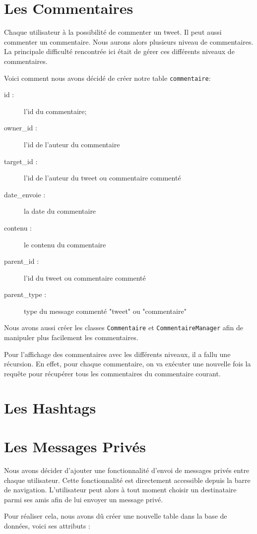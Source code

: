 \documentclass[a4paper, 12pt]{article}
\begin{document}
\section{Les Commentaires}	
Chaque utilisateur à la possibilité de commenter un tweet. Il peut aussi commenter un commentaire. Nous aurons alors plusieurs niveau de commentaires. La principale difficulté rencontrée ici était de gérer ces différents niveaux de commentaires.

Voici comment nous avons décidé de créer notre table \texttt{commentaire}:
\begin{description}
\item[id :] l'id du commentaire;
\item[owner\_id :] l'id de l'auteur du commentaire
\item[target\_id :] l'id de l'auteur du tweet ou commentaire commenté
\item[date\_envoie :] la date du commentaire
\item[contenu :] le contenu du commentaire
\item[parent\_id :] l'id du tweet ou commentaire commenté
\item[parent\_type :] type du message commenté "tweet" ou "commentaire"
\end{description}
Nous avons aussi créer les classes \texttt{Commentaire} et \texttt{CommentaireManager} afin de manipuler plus facilement les commentaires.

Pour l'affichage des commentaires avec les différents niveaux, il a fallu une récursion. En effet, pour chaque commentaire, on va exécuter une nouvelle fois la requête pour récupérer tous les commentaires du commentaire courant.

\section{Les Hashtags}		

\newpage
\section{Les Messages Privés}	
Nous avons décider d'ajouter une fonctionnalité d'envoi de messages privés entre chaque utilisateur. 
Cette fonctionnalité est directement accessible depuis la barre de navigation. L'utilisateur peut alors à tout moment choisir un destinataire parmi ses amis afin de lui envoyer un message privé.

Pour réaliser cela, nous avons dû créer une nouvelle table dans la base de données, voici ses attributs :
\end{document}
